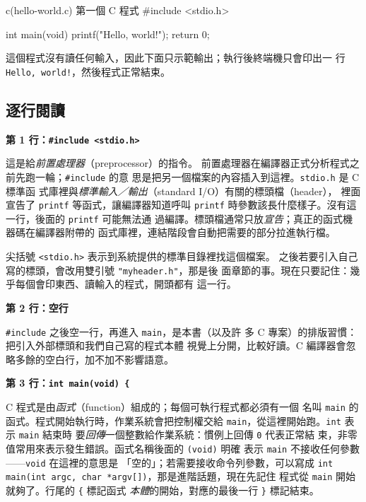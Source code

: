 \begin{example}{c}{(hello-world.c) 第一個 C 程式}
#include <stdio.h>

int main(void) {
    printf("Hello, world!\n");
    return 0;
}
\end{example}


這個程式沒有讀任何輸入，因此下面只示範輸出；執行後終端機只會印出一
行 \texttt{Hello, world!}，然後程式正常結束。

\subsection{逐行閱讀}

\textbf{第 1 行：\texttt{\#include <stdio.h>}}

這是給\emph{前置處理器}（preprocessor）的指令。
前置處理器在編譯器正式分析程式之前先跑一輪；\texttt{\#include} 的意
思是把另一個檔案的內容插入到這裡。\texttt{stdio.h} 是 C 標準函
式庫裡與\emph{標準輸入／輸出}（standard I/O）有關的標頭檔（header），
裡面宣告了 \texttt{printf} 等函式，讓編譯器知道呼叫 \texttt{printf}
時參數該長什麼樣子。沒有這一行，後面的 \texttt{printf} 可能無法通
過編譯。標頭檔通常只放\emph{宣告}；真正的函式機器碼在編譯器附帶的
函式庫裡，連結階段會自動把需要的部分拉進執行檔。

尖括號 \texttt{<stdio.h>} 表示到系統提供的標準目錄裡找這個檔案。
之後若要引入自己寫的標頭，會改用雙引號 \texttt{"myheader.h"}，那是後
面章節的事。現在只要記住：幾乎每個會印東西、讀輸入的程式，開頭都有
這一行。

\textbf{第 2 行：空行}

\texttt{\#include} 之後空一行，再進入 \texttt{main}，是本書（以及許
多 C 專案）的排版習慣：把引入外部標頭和我們自己寫的程式本體
視覺上分開，比較好讀。C 編譯器會忽略多餘的空白行，加不加不影響語意。

\textbf{第 3 行：\texttt{int main(void) \{}}

C 程式是由\emph{函式}（function）組成的；每個可執行程式都必須有一個
名叫 \texttt{main} 的函式。程式開始執行時，作業系統會把控制權交給
\texttt{main}，從這裡開始跑。\texttt{int} 表示 \texttt{main} 結束時
要\emph{回傳}一個整數給作業系統：慣例上回傳 \texttt{0} 代表正常結
束，非零值常用來表示發生錯誤。函式名稱後面的 \texttt{(void)} 明確
表示 \texttt{main} 不接收任何參數——\texttt{void} 在這裡的意思是
「空的」；若需要接收命令列參數，可以寫成
\texttt{int main(int argc, char *argv[])}，那是進階話題，現在先記住
程式從 \texttt{main} 開始就夠了。行尾的 \texttt{\{} 標記函式
\emph{本體}的開始，對應的最後一行 \texttt{\}} 標記結束。

